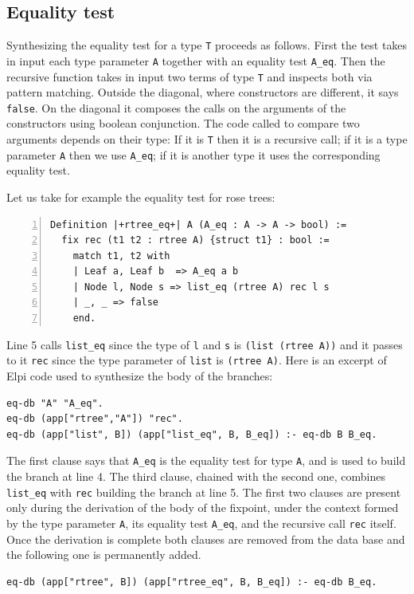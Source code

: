 \documentclass[a4paper,UKenglish,cleveref, autoref]{lipics-v2019}
\begin{document}
\subsection{Equality test} %

Synthesizing the equality test for a type \lstinline+T+ proceeds as follows.
First the test takes in input each type parameter \lstinline+A+ together with
an equality test \lstinline+A_eq+.  Then the recursive function
takes in input two terms of type \lstinline+T+ and inspects both via
pattern matching.  Outside the diagonal, where constructors are
different, it says \lstinline+false+. On the diagonal it composes the
calls on the arguments of the constructors using boolean conjunction.
The code called to compare two arguments depends on their type: If it
is \lstinline+T+ then it is a recursive call; if it is a type
parameter \lstinline+A+ then we use \lstinline+A_eq+; if it is
another type it uses the corresponding equality test.

Let us take for example the equality test for rose trees:
\begin{lstlisting}[numbers=left]
Definition |+rtree_eq+| A (A_eq : A -> A -> bool) :=
  fix rec (t1 t2 : rtree A) {struct t1} : bool :=
    match t1, t2 with
    | Leaf a, Leaf b  => A_eq a b
    | Node l, Node s => list_eq (rtree A) rec l s
    | _, _ => false
    end.
\end{lstlisting}

\noindent
Line 5 calls \lstinline+list_eq+ since the type of \lstinline+l+ and
\lstinline+s+ is \lstinline+(list (rtree A))+ and it passes to it
\lstinline+rec+ since the type parameter of \lstinline+list+ is
\lstinline+(rtree A)+.
\newpage
Here is an excerpt of Elpi code used to synthesize the body of the
branches:
\begin{lstlisting}
eq-db "A" "A_eq".
eq-db (app["rtree","A"]) "rec".
eq-db (app["list", B]) (app["list_eq", B, B_eq]) :- eq-db B B_eq.
\end{lstlisting}

\noindent
The first clause says that \lstinline+A_eq+ is the equality test for type
\lstinline+A+, and is used to build the branch at line 4.
The third clause, chained with the second one, combines
\lstinline+list_eq+ with \lstinline+rec+ building the branch at line
5.
The first two clauses are present only during the
derivation of the body of the fixpoint, under the context formed by
the type parameter \lstinline+A+, its equality test
\lstinline+A_eq+, and the recursive call \lstinline+rec+ itself. 
Once the derivation is complete both clauses are removed 
from the data base and the
following one is permanently added.
\begin{lstlisting}[]
eq-db (app["rtree", B]) (app["rtree_eq", B, B_eq]) :- eq-db B_eq.
\end{lstlisting}
\end{document}
